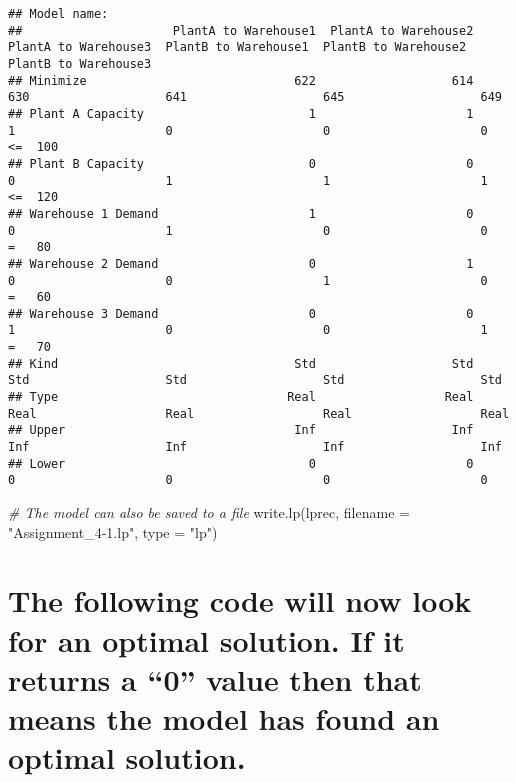 \documentclass[
]{article}
\newenvironment{Shaded}{\begin{snugshade}}{\end{snugshade}}
\newcommand{\AttributeTok}[1]{\textcolor[rgb]{0.77,0.63,0.00}{#1}}
\newcommand{\CommentTok}[1]{\textcolor[rgb]{0.56,0.35,0.01}{\textit{#1}}}
\newcommand{\FunctionTok}[1]{\textcolor[rgb]{0.00,0.00,0.00}{#1}}
\newcommand{\NormalTok}[1]{#1}
\newcommand{\StringTok}[1]{\textcolor[rgb]{0.31,0.60,0.02}{#1}}
\begin{document}
\begin{verbatim}
## Model name: 
##                     PlantA to Warehouse1  PlantA to Warehouse2  PlantA to Warehouse3  PlantB to Warehouse1  PlantB to Warehouse2  PlantB to Warehouse3         
## Minimize                             622                   614                   630                   641                   645                   649         
## Plant A Capacity                       1                     1                     1                     0                     0                     0  <=  100
## Plant B Capacity                       0                     0                     0                     1                     1                     1  <=  120
## Warehouse 1 Demand                     1                     0                     0                     1                     0                     0   =   80
## Warehouse 2 Demand                     0                     1                     0                     0                     1                     0   =   60
## Warehouse 3 Demand                     0                     0                     1                     0                     0                     1   =   70
## Kind                                 Std                   Std                   Std                   Std                   Std                   Std         
## Type                                Real                  Real                  Real                  Real                  Real                  Real         
## Upper                                Inf                   Inf                   Inf                   Inf                   Inf                   Inf         
## Lower                                  0                     0                     0                     0                     0                     0
\end{verbatim}

\begin{Shaded}
\begin{Highlighting}[]
\CommentTok{\# The model can also be saved to a file}
\FunctionTok{write.lp}\NormalTok{(lprec, }\AttributeTok{filename =} \StringTok{"Assignment\_4{-}1.lp"}\NormalTok{, }\AttributeTok{type =} \StringTok{"lp"}\NormalTok{)}
\end{Highlighting}
\end{Shaded}

\hypertarget{the-following-code-will-now-look-for-an-optimal-solution.-if-it-returns-a-0-value-then-that-means-the-model-has-found-an-optimal-solution.}{%
\section{The following code will now look for an optimal solution. If it
returns a ``0'' value then that means the model has found an optimal
solution.}\label{the-following-code-will-now-look-for-an-optimal-solution.-if-it-returns-a-0-value-then-that-means-the-model-has-found-an-optimal-solution.}}
\end{document}
